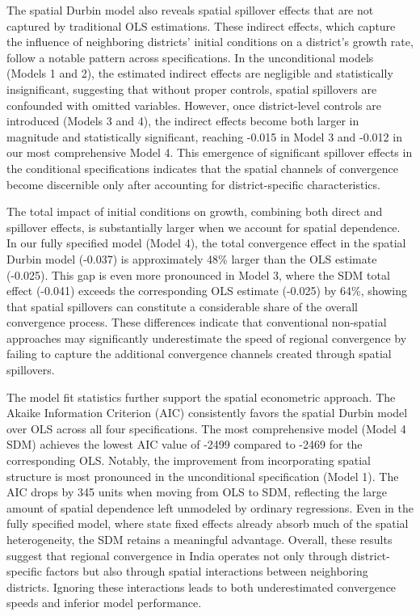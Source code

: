 \documentclass[
  letterpaper,
  DIV=11,
  numbers=noendperiod]{scrartcl}
\begin{document}
The spatial Durbin model also reveals spatial spillover effects that are
not captured by traditional OLS estimations. These indirect effects,
which capture the influence of neighboring districts' initial conditions
on a district's growth rate, follow a notable pattern across
specifications. In the unconditional models (Models 1 and 2), the
estimated indirect effects are negligible and statistically
insignificant, suggesting that without proper controls, spatial
spillovers are confounded with omitted variables. However, once
district-level controls are introduced (Models 3 and 4), the indirect
effects become both larger in magnitude and statistically significant,
reaching -0.015 in Model 3 and -0.012 in our most comprehensive Model 4.
This emergence of significant spillover effects in the conditional
specifications indicates that the spatial channels of convergence become
discernible only after accounting for district-specific characteristics.

The total impact of initial conditions on growth, combining both direct
and spillover effects, is substantially larger when we account for
spatial dependence. In our fully specified model (Model 4), the total
convergence effect in the spatial Durbin model (-0.037) is approximately
48\% larger than the OLS estimate (-0.025). This gap is even more
pronounced in Model 3, where the SDM total effect (-0.041) exceeds the
corresponding OLS estimate (-0.025) by 64\%, showing that spatial
spillovers can constitute a considerable share of the overall
convergence process. These differences indicate that conventional
non-spatial approaches may significantly underestimate the speed of
regional convergence by failing to capture the additional convergence
channels created through spatial spillovers.

The model fit statistics further support the spatial econometric
approach. The Akaike Information Criterion (AIC) consistently favors the
spatial Durbin model over OLS across all four specifications. The most
comprehensive model (Model 4 SDM) achieves the lowest AIC value of -2499
compared to -2469 for the corresponding OLS. Notably, the improvement
from incorporating spatial structure is most pronounced in the
unconditional specification (Model 1). The AIC drops by 345 units when
moving from OLS to SDM, reflecting the large amount of spatial
dependence left unmodeled by ordinary regressions. Even in the fully
specified model, where state fixed effects already absorb much of the
spatial heterogeneity, the SDM retains a meaningful advantage. Overall,
these results suggest that regional convergence in India operates not
only through district-specific factors but also through spatial
interactions between neighboring districts. Ignoring these interactions
leads to both underestimated convergence speeds and inferior model
performance.
\end{document}
